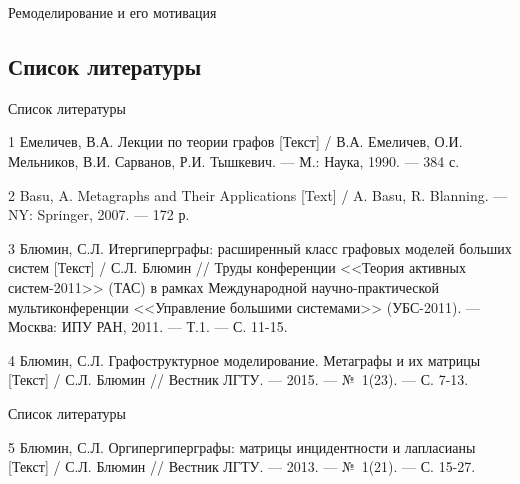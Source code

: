 \documentclass{beamer}
\begin{document}
\begin{darkframes}
\begin{frame}[label=math]{Ремоделирование и его мотивация}
   	
	\end{frame}




		\subsection{Список литературы}
		\begin{frame}[label=bibliography]{Список литературы}
			\begin{thebibliography}{9}
					\justifying
				\small{
				\item[1] Емеличев, В.А. Лекции по теории графов [Текст] / В.А. Емеличев, О.И. Мельников, В.И. Сарванов, Р.И. Тышкевич. --- М.: Наука, 1990. --- 384 с.

				\item[2] Basu, A. Metagraphs and Their Applications [Text] / A. Basu, R. Blanning. --- NY: Springer, 2007. --- 172 р.	


				\item[3] Блюмин, С.Л. Итергиперграфы: расширенный класс графовых моделей больших систем [Текст]  / С.Л. Блюмин //  Труды конференции <<Теория активных систем-2011>> (ТАС) в рамках Международной научно-практической мультиконференции <<Управление большими системами>> (УБС-2011). --- Москва: ИПУ РАН, 2011. --- Т.1. --- С. 11-15.

				\item[4] Блюмин, С.Л. Графоструктурное моделирование. Метаграфы и их матрицы [Текст] / С.Л. Блюмин // Вестник ЛГТУ. --- 2015. --- №~1(23). --- С. 7-13.				
}

				
			\end{thebibliography}
		\end{frame}

		\begin{frame}[label=bibliography]{Список литературы}
			\begin{thebibliography}{9}

			\small{

				\item[5] Блюмин, С.Л. Оргипергиперграфы: матрицы инцидентности и лапласианы [Текст] / С.Л. Блюмин // Вестник ЛГТУ. --- 2013. --- №~1(21). --- С. 15-27.

}
\end{thebibliography}
\end{frame}
\end{darkframes}
\end{document}
